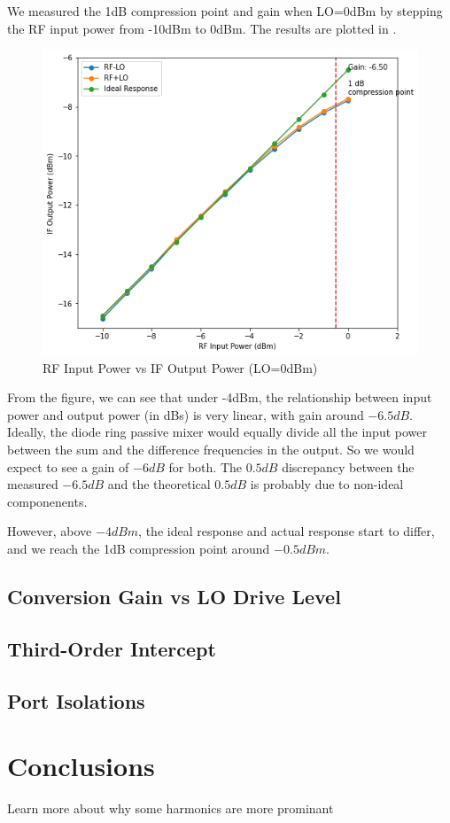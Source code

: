 \documentclass{article}
\begin{document}
We measured the 1dB compression point and gain when LO=0dBm by stepping the RF input power from -10dBm to 0dBm.
The results are plotted in .

\begin{figure}
    \centering
    \includegraphics[width=0.5\linewidth]{./pics/1db_compression.png}
    \caption{RF Input Power vs IF Output Power (LO=0dBm)}
    \label{fig:rf_if}
\end{figure}

From the figure, we can see that under -4dBm, the relationship between input power and output power (in dBs) is very linear, with gain around $-6.5dB$.
Ideally, the diode ring passive mixer would equally divide all the input power between the sum and the difference frequencies in the output.
So we would expect to see a gain of $-6dB$ for both.
The $0.5dB$ discrepancy between the measured $-6.5dB$ and the theoretical $0.5dB$ is probably due to non-ideal componenents.

However, above $-4dBm$, the ideal response and actual response start to differ, and we reach the 1dB compression point around $-0.5dBm$.

\subsection{Conversion Gain vs LO Drive Level}

\subsection{Third-Order Intercept}

\subsection{Port Isolations}

\section{Conclusions}
Learn more about why some harmonics are more prominant
\end{document}
